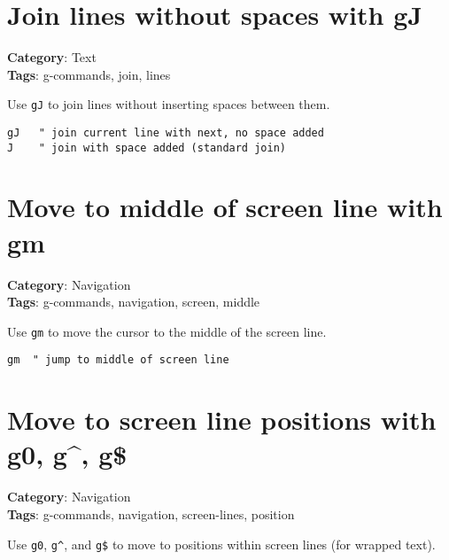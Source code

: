 {{{{{{\section{Join lines without spaces with gJ}

\textbf{Category}: Text\\ \textbf{Tags}: g-commands, join, lines
\vspace{0.5cm}

Use {\footnotesize \Verb§gJ§} to join lines without inserting spaces between them.

\begin{Exa*}{}
\begin{Verbatim}[fontsize=\footnotesize, breaklines, breakanywhere]
gJ   " join current line with next, no space added
J    " join with space added (standard join)
\end{Verbatim}
\end{Exa*}

\section{Move to middle of screen line with gm}

\textbf{Category}: Navigation\\ \textbf{Tags}: g-commands, navigation, screen, middle
\vspace{0.5cm}

Use {\footnotesize \Verb§gm§} to move the cursor to the middle of the screen line.

\begin{Exa*}{}
\begin{Verbatim}[fontsize=\footnotesize, breaklines, breakanywhere]
gm  " jump to middle of screen line
\end{Verbatim}
\end{Exa*}

\section{Move to screen line positions with g0, g\textasciicircum{}, g\$}

\textbf{Category}: Navigation\\ \textbf{Tags}: g-commands, navigation, screen-lines, position
\vspace{0.5cm}

Use {\footnotesize \Verb§g0§}, {\footnotesize \Verb§g^§}, and {\footnotesize \Verb§g$§} to move to positions within screen lines (for wrapped text).

}}}}}}
